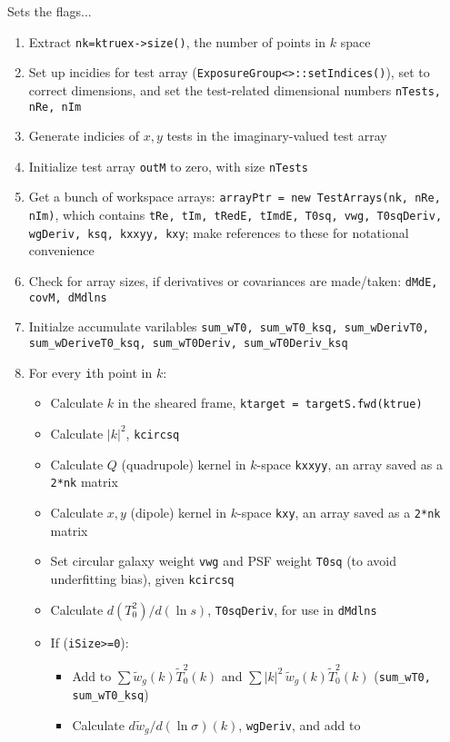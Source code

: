 \documentclass[useAMS,usenatbib,usegraphicx]{mn2e}
\begin{document}
Sets the flags...

\begin{enumerate}
\item Extract {\tt nk=ktruex->size()}, the number of points in $k$ space
\item Set up incidies for test array ({\tt ExposureGroup<>::setIndices()}), set to correct 
  dimensions, and set the test-related dimensional numbers {\tt nTests, nRe, nIm}
\item Generate indicies of $x,y$ tests in the imaginary-valued test array
\item Initialize test array {\tt outM} to zero, with size {\tt nTests}
\item Get a bunch of workspace arrays: {\tt arrayPtr = new TestArrays(nk, nRe, nIm)}, which 
contains {\tt tRe, tIm, tRedE, tImdE, T0sq, vwg, T0sqDeriv, wgDeriv, ksq, kxxyy, kxy};
make references to these for notational convenience
\item Check for array sizes, if derivatives or covariances are made/taken: {\tt dMdE, covM, dMdlns}
\item Initialze accumulate varilables {\tt sum\_wT0, sum\_wT0\_ksq, sum\_wDerivT0, 
sum\_wDeriveT0\_ksq, sum\_wT0Deriv, sum\_wT0Deriv\_ksq}
\item For every {\tt i}th point in $k$:
  \begin{itemize}
  \item Calculate $k$ in the sheared frame, {\tt ktarget = targetS.fwd(ktrue)} 
  \item Calculate $|k|^2$, {\tt kcircsq}
  \item Calculate $Q$ (quadrupole) kernel in $k$-space {\tt kxxyy}, an array saved as a 
    {\tt 2*nk} matrix
  \item Calculate $x,y$ (dipole) kernel in $k$-space {\tt kxy}, an array saved as a 
    {\tt 2*nk} matrix
  \item Set circular galaxy weight {\tt vwg} and PSF weight {\tt T0sq} (to avoid underfitting bias),
    given {\tt kcircsq}
  \item Calculate $d(T^2_0)/d(\ln s)$, {\tt T0sqDeriv}, for use in {\tt dMdlns}
  \item If ({\tt iSize>=0}):
    \begin{itemize}
    \item Add to $\sum\tilde{w}_g(k)\tilde{T}^2_0(k)$ and $\sum|k|^2\,\tilde{w}_g(k)\tilde{T}^2_0(k)$
      ({\tt sum\_wT0, sum\_wT0\_ksq})
    \item Calculate $d\tilde{w}_g/d(\ln \sigma)(k)$, {\tt wgDeriv}, and add to 

\end{itemize}
\end{itemize}
\end{enumerate}
\end{document}
